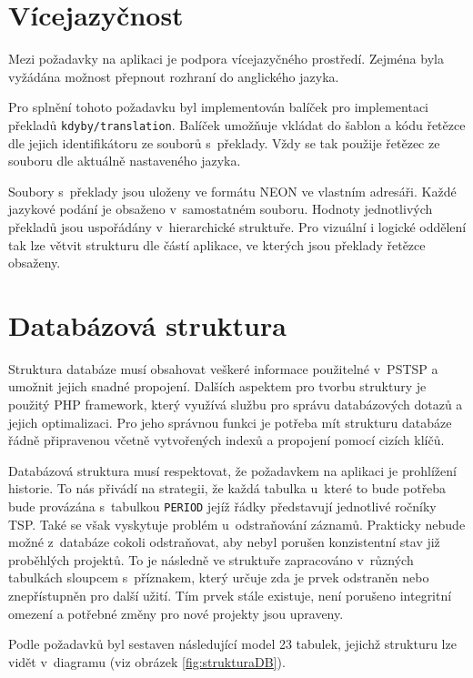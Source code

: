 \documentclass[czech,BP]{thesiskiv}
\begin{document}
		\section{Vícejazyčnost}
		\par Mezi požadavky na aplikaci je podpora vícejazyčného prostředí. Zejména byla vyžádána možnost přepnout rozhraní do anglického jazyka.
		\par Pro splnění tohoto požadavku byl implementován balíček pro implementaci překladů \texttt{kdyby/translation}. Balíček umožňuje vkládat do šablon a kódu řetězce dle jejich identifikátoru ze souborů s~překlady. Vždy se tak použije řetězec ze souboru dle aktuálně nastaveného jazyka.
		\par Soubory s~překlady jsou uloženy ve formátu NEON ve vlastním adresáři. Každé jazykové podání je obsaženo v~samostatném souboru. Hodnoty jednotlivých překladů jsou uspořádány v~hierarchické struktuře. Pro vizuální i logické oddělení tak lze větvit strukturu dle částí aplikace, ve kterých jsou překlady řetězce obsaženy.
	
	\section{Databázová struktura}
		\par Struktura databáze musí obsahovat veškeré informace použitelné v~PSTSP a umožnit jejich snadné propojení. Dalších aspektem pro tvorbu struktury je použitý PHP framework, který využívá službu pro správu databázových dotazů a jejich optimalizaci. Pro jeho správnou funkci je potřeba mít strukturu databáze řádně připravenou včetně vytvořených indexů a propojení pomocí cizích klíčů.
		\par Databázová struktura musí respektovat, že požadavkem na aplikaci je prohlížení historie. To nás přivádí na strategii, že každá tabulka u~které to bude potřeba bude provázána s~tabulkou \texttt{PERIOD} jejíž řádky představují jednotlivé ročníky TSP. Také se však vyskytuje problém u~odstraňování záznamů. Prakticky nebude možné z~databáze cokoli odstraňovat, aby nebyl porušen konzistentní stav již proběhlých projektů. To je následně ve struktuře zapracováno v~různých tabulkách sloupcem s~příznakem, který určuje zda je prvek odstraněn nebo znepřístupněn pro další užití. Tím prvek stále existuje, není porušeno integritní omezení a potřebné změny pro nové projekty jsou upraveny.
		\par Podle požadavků byl sestaven následující model 23 tabulek, jejichž strukturu lze vidět v~diagramu (viz obrázek \ref{fig:strukturaDB}).
		
\end{document}

